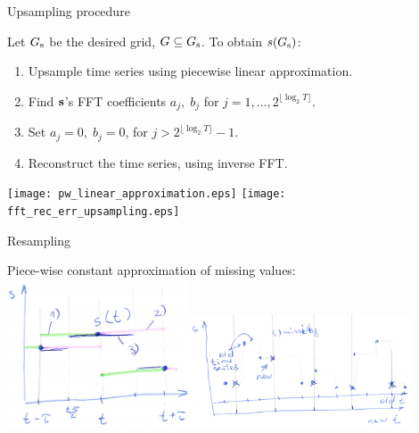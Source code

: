 \documentclass{beamer}
\begin{document}
\begin{frame}{Upsampling procedure}

Let $G_{\text{s}}$ be the desired grid, $G \subseteq G_{\text{s}}$. To obtain $s(G_{\text{s}})$:
\begin{enumerate}
\item Upsample time series using piecewise linear approximation.
\item Find ${\mathbf{s}}$'s FFT coefficients $a_j,\; b_j$ for  $j = 1, \dots, 2^{\lfloor\log_2T\rfloor}$.
\item Set $a_j = 0,\; b_j=0$, for  $j > 2^{\lfloor\log_2T\rfloor} - 1$.
\item Reconstruct the time series, using inverse FFT.

\end{enumerate}
\texttt{[image: pw\_linear\_approximation.eps]}
\texttt{[image: fft\_rec\_err\_upsampling.eps]}

\end{frame}
\begin{frame}{Resampling}


Piece-wise constant approximation of missing values:
\includegraphics[width=0.4\textwidth]{resample1.png}\includegraphics[width=0.5\textwidth]{resample2.png}


\end{frame}
\end{document}
